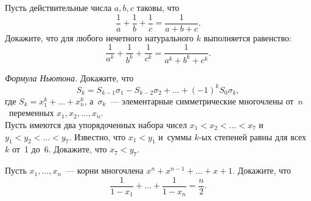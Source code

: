 \begin{problems}

\item
Пусть действительные числа $a, b, c$ таковы, что
\[
    \frac{1}{a} + \frac{1}{b} + \frac{1}{c}
=
    \frac{1}{a + b + c}
.\]
Докажите, что для любого нечетного натурального $k$ выполняется равенство:
\[
    \frac{1}{a^k} + \frac{1}{b^k} + \frac{1}{c^k}
=
    \frac{1}{a^k + b^k + c^k}
.\]

\item
\sp\emph{Формула Ньютона.}
Докажите, что
\[
    S_k
=
    S_{k-1} \sigma_{1} - S_{k-2} \sigma_{2} + \ldots + (-1)^k S_0 \sigma_k
,\]
где $S_k = x_1^k + \ldots + x_n^k$, а~$\sigma_k$~--- элементарные
симметрические многочлены от~$n$~переменных $x_1, x_2, \ldots, x_n$.
\\
\sp
Пусть имеются два упорядоченных набора чисел
$x_1 < x_2 < \ldots < x_7$ и~$y_1 < y_2 < \ldots < y_7$.
Известно, что $x_1 < y_1$ и~суммы $k$-ых степеней равны для всех $k$ от~1 до~6.
Докажите, что $x_7 < y_7$.

\item
Пусть $x_1, \ldots, x_n$~--- корни многочлена
$x^n + x^{n - 1} + \ldots + x + 1$.
Докажите, что
\[
    \frac{1}{1 - x_1} + \ldots + \frac{1}{1 - x_n}
=
    \frac{n}{2}
.\]

\end{problems}


